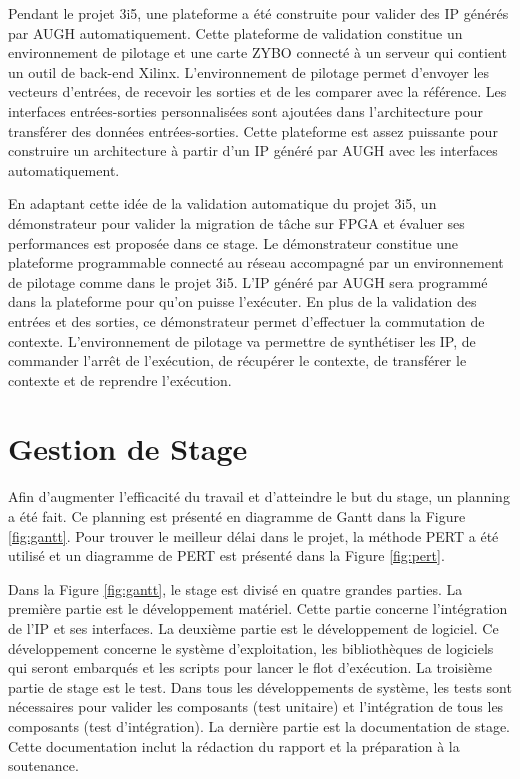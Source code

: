 Pendant le projet 3i5, une plateforme a été construite pour valider des IP générés par AUGH automatiquement\cite{Brisebard2015, Wicaksana2015}.
Cette plateforme de validation constitue un environnement de pilotage et une carte ZYBO\cite{zyboweb}
connecté à un serveur qui contient un outil de back-end Xilinx. L'environnement de pilotage permet d'envoyer les
vecteurs d'entrées, de recevoir les sorties et de les comparer avec la référence.
Les interfaces entrées-sorties personnalisées sont ajoutées dans l'architecture pour transférer des données entrées-sorties.
Cette plateforme est assez puissante pour construire un architecture à partir d'un IP généré par AUGH
avec les interfaces automatiquement.

En adaptant cette idée de la validation automatique du projet 3i5, un démonstrateur pour valider la migration de tâche sur FPGA et évaluer ses performances
est proposée dans ce stage. Le démonstrateur constitue une plateforme programmable connecté au réseau 
accompagné par un environnement de pilotage comme dans le projet 3i5. L'IP généré par AUGH sera programmé dans la plateforme
pour qu'on puisse l'exécuter.
En plus de la validation des entrées et des sorties, ce démonstrateur permet d'effectuer la commutation de contexte.
L'environnement de pilotage va permettre de synthétiser les IP, de commander l'arrêt de l'exécution, de récupérer le contexte, de
transférer le contexte et de reprendre l'exécution.

\section{Gestion de Stage}
\label{sec:gestion}
\justify
Afin d'augmenter l'efficacité du travail et d'atteindre le but du stage, un planning a été fait.
Ce planning est présenté en diagramme de Gantt dans la Figure \ref{fig:gantt}. Pour trouver le meilleur délai
dans le projet, la méthode PERT a été utilisé et un diagramme de PERT est présenté
dans la Figure \ref{fig:pert}.

Dans la Figure \ref{fig:gantt}, le stage est divisé en quatre grandes parties. 
La première partie est le développement matériel. Cette partie concerne 
l'intégration de l'IP et ses interfaces. La deuxième partie est le développement de logiciel. Ce développement
concerne le système d'exploitation, les bibliothèques de logiciels qui seront embarqués et les scripts pour lancer le flot d'exécution.
La troisième partie de stage est le test. Dans tous les développements de système, les tests sont nécessaires
pour valider les composants (test unitaire) et l'intégration de tous les composants (test d'intégration). La dernière partie
est la documentation de stage. Cette documentation inclut la rédaction du rapport et la préparation à la soutenance.

